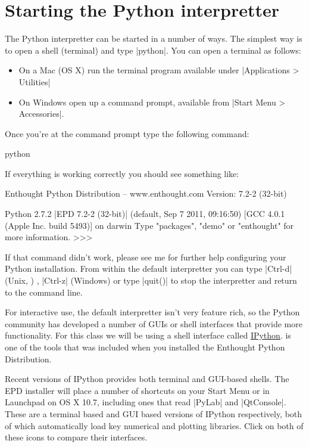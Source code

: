\section{Starting the Python interpretter}

The Python interpretter can be started in a number of ways. The simplest
way is to open a shell (terminal) and type |python|. You can open a terminal as follows:
%
\begin{itemize}
    \item On a Mac (OS X) run the terminal program available under |Applications > Utilities|
    \item On Windows open up a command prompt, available from |Start Menu > Accessories|. 
\end{itemize}
%

Once you're at the command prompt type the following command:
\begin{bash}
python
\end{bash}
% 
If everything is working correctly you should see something like:
%
\begin{python}
Enthought Python Distribution -- www.enthought.com
Version: 7.2-2 (32-bit)

Python 2.7.2 |EPD 7.2-2 (32-bit)| (default, Sep  7 2011, 09:16:50) 
[GCC 4.0.1 (Apple Inc. build 5493)] on darwin
Type "packages", "demo" or "enthought" for more information.
>>>     
\end{python}
%
If that command didn't work, please see me for further help configuring your Python installation. From within the default
interpretter you can type |Ctrl-d| (Unix, \OSX) , |Ctrl-z| (Windows) or type |quit()| to stop the interpretter and return to the
command line.

For interactive use, the default interpretter isn't very feature rich,
so the Python community has developed a number of GUIs or shell
interfaces that provide more functionality. For this class we will be
using a shell interface called \href{http://ipython.org/}{IPython}. \ipython is one of the tools that was included when you installed the Enthought Python Distribution.

Recent versions of IPython provides both terminal and GUI-based
shells. The EPD installer will place a number of shortcuts on your Start
Menu or in Launchpad on OS X 10.7, including ones that read
|PyLab| and |QtConsole|. These are a terminal based
and GUI based versions of IPython respectively, both of which
automatically load key numerical and plotting libraries. Click on both
of these icons to compare their interfaces.

